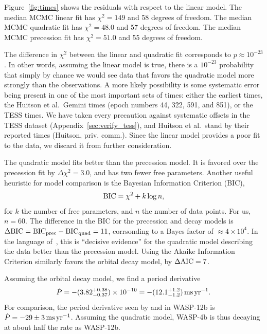 \documentclass[12pt,twocolumn,tighten]{aastex62}
\begin{document}
Figure~\ref{fig:times} shows the residuals with respect to the linear
model.  The median MCMC linear fit has $\chi^2 = 149$ and 58 degrees of
freedom.  The median MCMC quadratic fit has $\chi^2 = 48.0$ and 57
degrees of freedom.  The median MCMC precession fit has $\chi^2 = 51.0$
and 55 degrees of freedom.

The difference in $\chi^2$ between the linear and quadratic fit
corresponds to $p \approx 10^{-23}$. In other words, assuming the linear
model is true, there is a $10^{-23}$ probability that simply by chance
we would see data that favors the quadratic model more strongly than the
observations.  A more likely possibility is some systematic error being
present in one of the most important sets of times: either the earliest
times, the Huitson et al.\ Gemini times (epoch numbers 44, 322, 591, and
851), or the TESS times.  We have taken every precaution against
systematic offsets in the TESS dataset (Appendix~\ref{sec:verify_tess}),
and Huitson et al.\ stand by their reported times (Huitson, priv.
comm.).  Since the linear model provides a poor fit to the data, we
discard it from further consideration.

The quadratic model fits better than the precession model.  It is
favored over the precession fit by $\Delta \chi^2 = 3.0$, and has two
fewer free parameters.  Another useful heuristic for model comparison is
the Bayesian Information Criterion (BIC),
\begin{equation}
  {\rm BIC} = \chi^2 + k\log n,
\end{equation}
for $k$ the number of free parameters, and $n$ the number of data
points. For us, $n=60$.  The difference in the BIC for the precession
and decay models is $\Delta {\rm BIC} = {\rm BIC}_{\rm prec} - {\rm
BIC}_{\rm quad} = 11$, corrsonding to a Bayes factor of $\approx
4\times10^{4}$.  In the language of~\citet{kass_bayes_1995}, this is
``decisive evidence'' for the quadratic model describing the data better
than the precession model.  Using the Akaike Information Criterion
similarly favors the orbital decay model, by $\Delta {\rm AIC} = 7$.

Assuming the orbital decay model, we find a period derivative 
\begin{equation}
\dot{P}
    = - (3.82^{+0.38}_{-0.37})\times 10^{-10}
    = - (12.1^{+1.2}_{-1.2})\,{\rm ms}\,{\rm yr}^{-1}.
\end{equation}
For comparison, the period derivative seen by
\citet{maciejewski_departure_2016} and \citet{patra_2017} in WASP-12b is
$\dot{P} = -29 \pm 3\,{\rm ms}\,{\rm yr}^{-1}$.  Assuming the quadratic
model, WASP-4b is thus decaying at about half the rate as WASP-12b.
\end{document}
